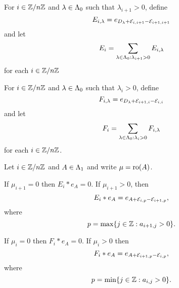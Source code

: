 \documentclass[a4paper, 11pt, twoside]{report}
\begin{document}
For $i\in\mathbb{Z}/{n \mathbb{Z}}$ and $\lambda\in\Lambda_0{}$ such that $\lambda_{i+1}>0$, define
\begin{equation*}
E_{i,\lambda} = e_{D_{\lambda} + \mathcal{E}_{i,i+1} - \mathcal{E}_{i+1,i+1}}
\end{equation*}
and let
\begin{equation*}
E_i = \sum_{\lambda\in\Lambda_0{}:\lambda_{i+1}>0} E_{i,\lambda}
\end{equation*}
for each $i\in\mathbb{Z}/{n \mathbb{Z}}$

For $i\in\mathbb{Z}/{n \mathbb{Z}}$ and $\lambda\in\Lambda_0{}$ such that $\lambda_i>0$, define
\begin{equation*}
F_{i,\lambda} = e_{D_{\lambda} + \mathcal{E}_{i+1,i} - \mathcal{E}_{i,i}}
\end{equation*}
and let
\begin{equation*}
F_i = \sum_{\lambda\in\Lambda_0{}:\lambda_i>0} F_{i,\lambda}
\end{equation*}
for each $i\in\mathbb{Z}/{n \mathbb{Z}}$.

\begin{lemma}\label{lemma:fundamental-multiplication-rule-generic}
Let $i\in\mathbb{Z}/{n \mathbb{Z}}$ and $A\in\Lambda_1{}$ and write $\mu=\operatorname{ro}(A)$.

If $\mu_{i+1}=0$ then $E_i\ast e_A=0$. If $\mu_{i+1}>0$, then
\begin{equation*}
E_i\ast e_A = e_{A+\mathcal{E}_{i,p}-\mathcal{E}_{i+1,p}},
\end{equation*}
where
\begin{equation*}
p=\max\{j\in\mathbb{Z}:a_{i+1,j}>0\}.
\end{equation*}

If $\mu_i=0$ then $F_i\ast e_A=0$. If $\mu_i>0$ then
\begin{equation*}
F_i\ast e_A = e_{A+\mathcal{E}_{i+1,p}-\mathcal{E}_{i,p}},
\end{equation*}
where
\begin{equation*}
p=\min\{j\in\mathbb{Z}: a_{i,j}>0\}.
\end{equation*}
\end{lemma}
\end{document}
